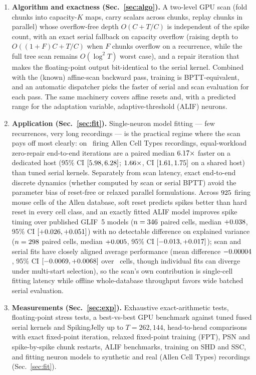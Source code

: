 \documentclass[10pt]{article}
\newcounter{algo}
\theoremstyle{remark}
\begin{document}
\begin{enumerate}[leftmargin=*]
\item \textbf{Algorithm and exactness (Sec.~\ref{sec:algo}).} A two-level GPU scan (fold chunks into capacity-$K$ maps, carry scalars across chunks, replay chunks in parallel) whose overflow-free depth $O(C+T/C)$ is independent of the spike count, with an exact serial fallback on capacity overflow (raising depth to $O((1+F)C+T/C)$ when $F$ chunks overflow on a recurrence, while the full tree scan remains $O(\log^2 T)$ worst case), and a repair iteration that makes the floating-point output bit-identical to the serial kernel. Combined with the (known) affine-scan backward pass, training is BPTT-equivalent, and an automatic dispatcher picks the faster of serial and scan evaluation for each pass. The same machinery covers affine resets and, with a predicted range for the adaptation variable, adaptive-threshold (ALIF) neurons.
\item \textbf{Application (Sec.~\ref{sec:fit}).} Single-neuron model fitting --- few recurrences, very long recordings --- is the practical regime where the scan pays off most clearly: on \RealAuditCells\ firing Allen Cell Types recordings, equal-workload zero-repair end-to-end iterations are a paired median $6.17\times$ faster on a dedicated host (95\% CI $[5.98,6.28]$; $1.66\times$, CI $[1.61,1.75]$ on a shared host) than tuned serial kernels. Separately from scan latency, exact end-to-end discrete dynamics (whether computed by scan or serial BPTT) avoid the parameter bias of reset-free or relaxed parallel formulations. Across $925$ firing mouse cells of the Allen database, soft reset predicts spikes better than hard reset in every cell class, and an exactly fitted ALIF model improves spike timing over published GLIF~5 models ($n=346$ paired cells, median $+0.038$, 95\% CI $[+0.026,+0.051]$) with no detectable difference on explained variance ($n=298$ paired cells, median $+0.005$, 95\% CI $[{-}0.013,+0.017]$); scan and serial fits have closely aligned average performance (mean difference ${-}0.00004$, 95\% CI $[{-}0.0069,+0.0068]$ over \EqCells\ cells, though individual fits can diverge under multi-start selection), so the scan's own contribution is single-cell fitting latency while offline whole-database throughput favors wide batched serial evaluation.
\item \textbf{Measurements (Sec.~\ref{sec:exp}).} Exhaustive exact-arithmetic tests, floating-point stress tests, a best-vs-best GPU benchmark against tuned fused serial kernels and SpikingJelly up to $T=262{,}144$, head-to-head comparisons with exact fixed-point iteration, relaxed fixed-point training (FPT), PSN and spike-by-spike chunk restarts, ALIF benchmarks, training on SHD and SSC, and fitting neuron models to synthetic and real (Allen Cell Types) recordings (Sec.~\ref{sec:fit}).
\end{enumerate}
\end{document}
